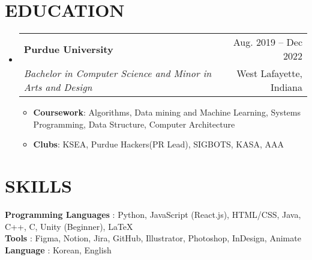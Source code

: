 \documentclass[letterpaper,11pt]{article}
\makeatletter
\newcommand{\resumeItem}[1]{
  \item\small{
    {#1 \vspace{-1pt}}
  }
}
\newcommand{\resumeSubheading}[4]{
  \vspace{-1pt}\item
    \begin{tabular*}{\textwidth}[t]{l@{\extracolsep{\fill}}r}
      \textbf{#1} & {\color{dark-grey}\small #2}\vspace{1pt}\\ %
      \textit{#3} & {\color{dark-grey} \small #4}\\ %
    \end{tabular*}\vspace{-4pt}
}
\newcommand{\resumeSubHeadingListStart}{\begin{itemize}[leftmargin=0in, label={}]}
\newcommand{\resumeSubHeadingListEnd}{\end{itemize}}
\newcommand{\resumeItemListStart}{\begin{itemize}}
\newcommand{\resumeItemListEnd}{\end{itemize}\vspace{0pt}}
\makeatother
\begin{document}
    \resumeProjectHeadingListEnd



\section {EDUCATION}
  \resumeSubHeadingListStart
    \resumeSubheading
      {Purdue University}{Aug. 2019 -- Dec 2022}
      {Bachelor in Computer Science and Minor in Arts and Design}{West Lafayette, Indiana}
      	\resumeItemListStart
    	\resumeItem {\textbf{Coursework}: Algorithms, Data mining and Machine Learning, Systems Programming, Data Structure, Computer Architecture}
        \resumeItem 
            {\textbf{Clubs}: KSEA, Purdue Hackers(PR Lead), SIGBOTS, KASA, AAA}
        \resumeItemListEnd
  \resumeSubHeadingListEnd


%
\section{SKILLS}
 \begin{itemize}[leftmargin=0in, label={}]
    \small{\item{
     \textbf{Programming Languages} {: Python, JavaScript (React.js), HTML/CSS, Java, C++, C, Unity (Beginner), LaTeX}\vspace{2pt} \\
     \textbf{Tools}     {: Figma, Notion, Jira, GitHub, Illustrator, Photoshop, InDesign, Animate}\vspace{2pt} \\
     \textbf{Language}     {: Korean, English}
    }}
 \end{itemize}


\end{document}
